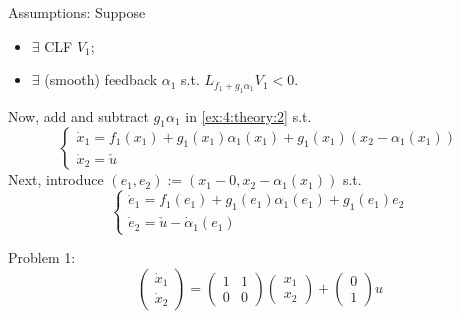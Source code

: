     Assumptions: Suppose \\
    \begin{itemize}
        \item $\exists$ CLF $V_1$;
        \item $\exists$ (smooth) feedback $\alpha_1$ s.t. $L_{f_1+g_1\alpha_1}V_1 < 0$.
    \end{itemize}
    Now, add and subtract $g_1\alpha_1$ in \ref{ex:4:theory:2} s.t.
    \begin{equation} \label{ex:4:theory:3}
    \left\{\begin{array}{ll}
        \dot x_1 = f_1(x_1)+g_1(x_1)\alpha_1(x_1)+g_1(x_1)(x_2-\alpha_1(x_1)) \\
        \dot x_2 = \check u
    \end{array} \right.
    \end{equation}
    Next, introduce $(e_1,e_2):=(x_1-0,x_2-\alpha_1(x_1))$ s.t.
     \begin{equation} \label{ex:4:theory:4}
    \left\{\begin{array}{ll}
        \dot e_1 = f_1(e_1)+g_1(e_1)\alpha_1(e_1)+g_1(e_1)e_2 \\
        \dot e_2 = \check u - \dot \alpha_1(e_1)
    \end{array} \right.
    \end{equation}
    
    Problem 1:
    $$\begin{pmatrix}
        \dot x_1 \\
        \dot x_2
    \end{pmatrix}
    =
    \begin{pmatrix}
        1 & 1 \\
        0 & 0
    \end{pmatrix}
    \begin{pmatrix}
        x_1 \\
        x_2
    \end{pmatrix} + 
    \begin{pmatrix}
        0 \\
        1
    \end{pmatrix} u$$
    
